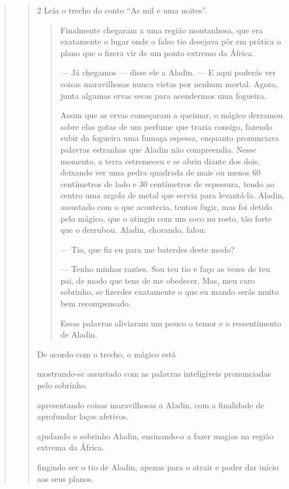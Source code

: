 \begin{escolha}
\begin{escolha}
\begin{escolha}
\begin{quote}
\begin{quote}
{\num{2} Leia o trecho do conto ``As mil e uma noites''.

\begin{quote}
Finalmente chegaram a uma região montanhosa, que era
exatamente o lugar onde o falso tio desejava pôr em prática o plano que
o fizera vir de um ponto extremo da África.

--- Já chegamos --- disse ele a Aladin. --- E aqui poderás ver coisas
maravilhosas nunca vistas por nenhum mortal. Agora, junta algumas ervas
secas para acendermos uma fogueira.

Assim que as ervas começaram a queimar, o mágico derramou sobre elas
gotas de um perfume que trazia consigo, fazendo subir da fogueira uma
fumaça espessa, enquanto pronunciava palavras estranhas que Aladin não
compreendia. Nesse momento, a terra estremeceu e se abriu diante dos
dois, deixando ver uma pedra quadrada de mais ou menos 60 centímetros de
lado e 30 centímetros de espessura, tendo ao centro uma argola de metal
que servia para levantá-la. Aladin, assustado com o que acontecia,
tentou fugir, mas foi detido pelo mágico, que o atingiu com um soco no
rosto, tão forte que o derrubou. Aladin, chorando, falou:

--- Tio, que fiz eu para me baterdes deste modo?

--- Tenho minhas razões. Sou teu tio e faço as vezes de teu pai, de modo
que tens de me obedecer. Mas, meu caro sobrinho, se fizerdes exatamente
o que eu mando serás muito bem recompensado.

Essas palavras aliviaram um pouco o temor e o ressentimento de Aladin.
\end{quote}


De acordo com o trecho, o mágico está

\begin{escolha}
\item mostrando-se assustado com as palavras inteligíveis pronunciadas pelo sobrinho.

\item apresentando coisas maravilhosas a Aladin, com a finalidade de aprofundar laços afetivos.

\item ajudando o sobrinho Aladin, ensinando-o a fazer magias na região extrema da África.

\item fingindo ser o tio de Aladin, apenas para o atrair e poder dar início aos seus planos.
\end{escolha}

}
\end{quote}
\end{quote}
\end{escolha}
\end{escolha}
\end{escolha}
